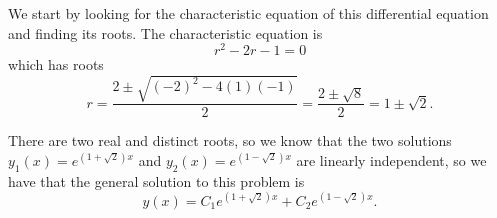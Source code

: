 \documentclass{ximera}
\begin{document}
\begin{exampleSol}
    We start by looking for the characteristic equation of this differential equation and finding its roots. The characteristic equation is
    \begin{equation*}
        r^2 - 2r - 1 = 0
    \end{equation*} which has roots
    \begin{equation*}
        r = \frac{2 \pm \sqrt{(-2)^2 - 4(1)(-1)}}{2} = \frac{2 \pm \sqrt{8}}{2} = 1 \pm \sqrt{2}.
    \end{equation*}
    
    There are two real and distinct roots, so we know that the two solutions $y_1(x) = e^{(1+\sqrt{2})x}$ and $y_2(x) = e^{(1-\sqrt{2})x}$ are linearly independent, so we have that the general solution to this problem is
    \begin{equation*}
        y(x) = C_1e^{(1+\sqrt{2})x} + C_2e^{(1 - \sqrt{2})x}.
    \end{equation*}
    

\end{exampleSol}
\end{document}
